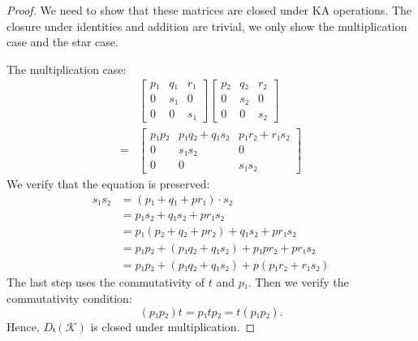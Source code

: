 \begin{proof}
  We need to show that these matrices are closed under KA operations.
  The closure under identities and addition are trivial, 
  we only show the multiplication case and the star case.

  The multiplication case:
  \begin{align*}
    & \begin{bmatrix}
      p₁ & q₁ & r₁ \\
      0 & s₁ & 0 \\  
      0 & 0 & s₁
    \end{bmatrix}
    \begin{bmatrix}
      p₂ & q₂ & r₂ \\
      0 & s₂ & 0 \\  
      0 & 0 & s₂
    \end{bmatrix} \\
    ={} & \begin{bmatrix}
      p₁ p₂ & p₁q₂ + q₁s₂ & p₁ r₂ + r₁ s₂ \\
      0 & s₁ s₂ & 0 \\  
      0 & 0 & s₁ s₂
    \end{bmatrix}
  \end{align*}
  We verify that the equation is preserved:
  \begin{align*}
    s₁ s₂ & = (p₁ + q₁ + p r₁) ⋅ s₂ \\  
    & = p₁ s₂ + q₁ s₂ + p r₁ s₂ \\  
    & = p₁ (p₂ + q₂ + p r₂) + q₁ s₂ + p r₁ s₂ \\  
    & = p₁ p₂ + (p₁q₂ + q₁s₂) + p₁ p r₂ + p r₁ s₂ \\ 
    & = p₁ p₂ + (p₁q₂ + q₁s₂) + p(p₁ r₂ + r₁ s₂) 
  \end{align*}
  The last step uses the commutativity of \(t\) and \(p₁\).
  Then we verify the commutativity condition:
  \[(p₁ p₂) t = p₁ t p₂ = t (p₁ p₂).\]
  Hence, \(Dₜ(𝒦)\) is closed under multiplication.


\end{proof}
